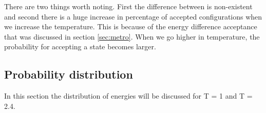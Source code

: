 There are two things worth noting. First the difference between is non-existent and second there is a huge increase in percentage of accepted configurations when we increase the temperature. This is because of the energy difference acceptance that was discussed in section \ref{sec:metro}. When we go higher in temperature, the probability for accepting a state becomes larger.

















\pagebreak
\subsection{Probability distribution}


In this section the distribution of energies will be discussed for T = 1 and T = 2.4. 


